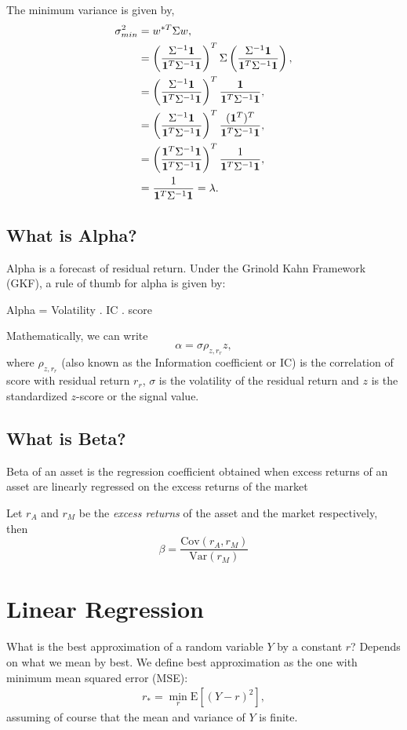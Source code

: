 \documentclass{amsart}
\theoremstyle{plain}
\numberwithin{equation}{section}
\begin{document}
The minimum variance is given by,
\begin{align*}
\sigma_{min}^2 &= w^{*T} \Sigma w,\\
&= \left(\frac{\Sigma^{-1} {\bf 1}}{{\bf 1}^T \Sigma^{-1} {\bf 1}}\right)^T
\Sigma \left(\frac{\Sigma^{-1} {\bf 1}}{{\bf 1}^T \Sigma^{-1} {\bf 1}}\right),\\
&=  \left(\frac{\Sigma^{-1} {\bf 1}}{{\bf 1}^T \Sigma^{-1} {\bf 1}}\right)^T
\frac{{\bf 1}}{{\bf 1}^T \Sigma^{-1} {\bf 1}},\\
&= \left(\frac{\Sigma^{-1} {\bf 1}}{{\bf 1}^T \Sigma^{-1} {\bf 1}}\right)^T
\frac{({\bf 1}^T)^T}{{\bf 1}^T \Sigma^{-1} {\bf 1}},\\
&= \left(\frac{{\bf 1}^T \Sigma^{-1} {\bf 1}}{{\bf 1}^T \Sigma^{-1} {\bf 1}}\right)^T
\frac{1}{{\bf 1}^T \Sigma^{-1} {\bf 1}},\\
&= \frac{1}{{\bf 1}^T \Sigma^{-1} {\bf 1}} = \lambda.
\end{align*}

\subsection*{What is Alpha?}
Alpha is a forecast of residual return.
Under the Grinold Kahn Framework (GKF), a rule
of thumb for alpha is given by:

Alpha = Volatility . IC . score

Mathematically, we can write 
\begin{equation}
\alpha = \sigma \rho_{z, r_r} z,
\end{equation}
where $\rho_{z,r_r}$ (also known as the 
Information coefficient or IC) is the 
correlation of score with 
residual return $r_r$, $\sigma$ is the 
volatility of the residual return
and $z$ is the standardized $z$-score or the
signal value. 

\subsection*{What is Beta?}
Beta of an asset is the regression coefficient
obtained when excess returns of an asset are 
linearly regressed on the excess returns of the market

Let $r_A$ and $r_M$ be the \emph{excess returns} 
of the asset and the market respectively, then
\begin{equation}
\beta = \frac{\mathrm{Cov}(r_A, r_M)}{\mathrm{Var}(r_M)}
\end{equation}

\section*{Linear Regression}
What is the best approximation of a random variable $Y$ by a constant $r$? Depends on 
what we mean by best. We define best approximation as the one
with minimum mean squared error (MSE):
\begin{align*}
r_* = \min_{r} \mathrm{E}[(Y-r)^2],
\end{align*}
assuming of course that the mean and variance of $Y$ is finite. 
\end{document}

